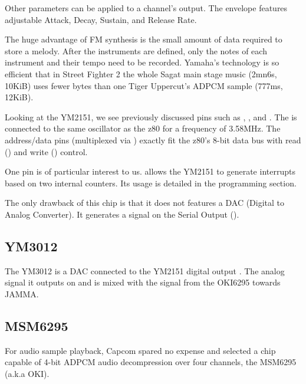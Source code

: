 Other parameters can be applied to a channel's output. The envelope features adjustable Attack, Decay, Sustain, and Release Rate. 


The huge advantage of FM synthesis is the small amount of data required to store a melody. After the instruments are defined, only the notes of each instrument and their tempo need to be recorded. Yamaha's technology is so efficient that in Street Fighter 2 the whole Sagat main stage music (2mn6s, 10KiB) uses fewer bytes than one Tiger Uppercut's ADPCM sample (777ms, 12KiB).




Looking at the YM2151, we see previously discussed pins such as , , and . The  is connected to the same oscillator as the z80 for a frequency of 3.58MHz. The  address/data pins (multiplexed via ) exactly fit the z80's 8-bit data bus with read () and write () control.


One pin is of particular interest to us.  allows the YM2151 to generate interrupts based on two internal counters. Its usage is detailed in the programming section.


The only drawback of this chip is that it does not features a DAC (Digital to Analog Converter). It generates a signal on the Serial Output (). 

\subsection{YM3012}

The YM3012 is a DAC connected to the YM2151 digital output . The analog signal it outputs on  and  is mixed with the signal from the OKI6295 towards JAMMA.



\subsection{MSM6295}

For audio sample playback, Capcom spared no expense and selected a chip capable of 4-bit ADPCM audio decompression over four channels, the MSM6295 (a.k.a OKI). 

